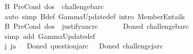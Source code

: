 \begin{isabellebody}
\isamarkupfalse%
\ B{}{\isacharcolon}{\kern0pt}\ {\isachardoublequoteopen}PreCond\ dos\ {\isasymGamma}\ challenge{\isacharbrackleft}{\kern0pt}b{\isacharcomma}{\kern0pt}a{\isacharcomma}{\kern0pt}r\isactrlsup c{\isacharbrackright}{\kern0pt}{\isachardoublequoteclose}\isanewline
%
\isadelimproof
\ \ %
\endisadelimproof
%
\isatagproof
{}\isamarkupfalse%
\ {\isacharparenleft}{\kern0pt}auto\ simp{\isacharcolon}{\kern0pt}\ {\isasymGamma}\isactrlsub B{\isacharunderscore}{\kern0pt}def\ GammaUpdate{\isacharunderscore}{\kern0pt}def\ intro{\isacharbang}{\kern0pt}{\isacharcolon}{\kern0pt}\ MemberEntails{\isacharparenright}{\kern0pt}%
\endisatagproof
{\isafoldproof}%
%
\isadelimproof
\isanewline
%
\endisadelimproof
{}\isamarkupfalse%
\ B{}{\isacharcolon}{\kern0pt}\ {\isachardoublequoteopen}PreCond\ dos\ {\isasymGamma}\ justify{\isacharbrackleft}{\kern0pt}a{\isacharcomma}{\kern0pt}n\isactrlsup c{\isasymturnstile}\isactrlsup {\isasymoplus}r\isactrlsup c{\isacharbrackright}{\kern0pt}{\isachardoublequoteclose}\isanewline
%
\isadelimproof
%
\endisadelimproof
%
\isatagproof
{}\isamarkupfalse%
\ {\isacharminus}{\kern0pt}\isanewline
\ \ \isamarkupfalse%
\ {\isachardoublequoteopen}{\isasymGamma}\ {\isacharparenleft}{\kern0pt}Done\isactrlsup d\ challenge{\isacharbrackleft}{\kern0pt}b{\isacharcomma}{\kern0pt}a{\isacharcomma}{\kern0pt}r\isactrlsup c{\isacharbrackright}{\kern0pt}{\isacharparenright}{\kern0pt}{\isachardoublequoteclose}\ \isamarkupfalse%
\ {\isacharparenleft}{\kern0pt}simp\ add{\isacharcolon}{\kern0pt}\ GammaUpdate{\isacharunderscore}{\kern0pt}def{\isacharparenright}{\kern0pt}\isanewline
\ \ \isamarkupfalse%
\ {\isachardoublequoteopen}{\isasymexists}j{\isachardot}{\kern0pt}\ j{\isasymnoteq}a\ {\isasymand}\ {\isacharparenleft}{\kern0pt}{\isasymGamma}\ {\isacharparenleft}{\kern0pt}Done\isactrlsup d\ question{\isacharbrackleft}{\kern0pt}j{\isacharcomma}{\kern0pt}a{\isacharcomma}{\kern0pt}r\isactrlsup c{\isacharbrackright}{\kern0pt}{\isacharparenright}{\kern0pt}\ {\isasymor}\ {\isasymGamma}\ {\isacharparenleft}{\kern0pt}Done\isactrlsup d\ challenge{\isacharbrackleft}{\kern0pt}j{\isacharcomma}{\kern0pt}a{\isacharcomma}{\kern0pt}r\isactrlsup c{\isacharbrackright}{\kern0pt}{\isacharparenright}{\kern0pt}{\isacharparenright}{\kern0pt}{\isachardoublequoteclose}\isanewline

\end{isabellebody}

